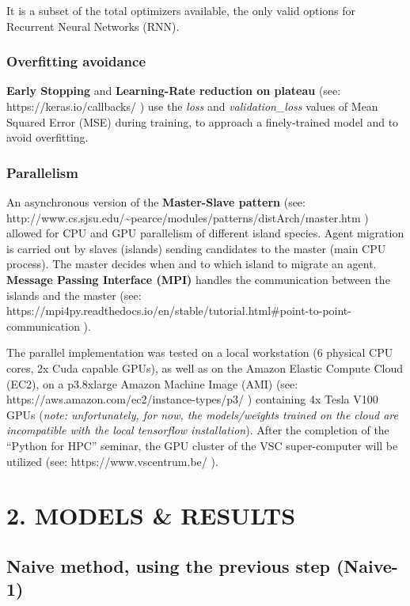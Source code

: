 \documentclass[11pt]{article}
\begin{document}
It is a subset of the total optimizers available, the only valid options
for Recurrent Neural Networks (RNN).

    \hypertarget{overfitting-avoidance}{%
\subsubsection{Overfitting avoidance}\label{overfitting-avoidance}}

\textbf{Early Stopping} and \textbf{Learning-Rate reduction on plateau}
(see: https://keras.io/callbacks/ ) use the \emph{loss} and
\emph{validation\_loss} values of Mean Squared Error (MSE) during
training, to approach a finely-trained model and to avoid overfitting.

    \hypertarget{parallelism}{%
\subsubsection{Parallelism}\label{parallelism}}

An asynchronous version of the \textbf{Master-Slave pattern} (see:
http://www.cs.sjsu.edu/\textasciitilde{}pearce/modules/patterns/distArch/master.htm
) allowed for CPU and GPU parallelism of different island species. Agent
migration is carried out by slaves (islands) sending candidates to the
master (main CPU process). The master decides when and to which island
to migrate an agent. \textbf{Message Passing Interface (MPI)} handles
the communication between the islands and the master (see:
https://mpi4py.readthedocs.io/en/stable/tutorial.html\#point-to-point-communication
).

The parallel implementation was tested on a local workstation (6
physical CPU cores, 2x Cuda capable GPUs), as well as on the Amazon
Elastic Compute Cloud (EC2), on a p3.8xlarge Amazon Machine Image (AMI)
(see: https://aws.amazon.com/ec2/instance-types/p3/ ) containing 4x
Tesla V100 GPUs (\emph{note: unfortunately, for now, the models/weights
trained on the cloud are incompatible with the local tensorflow
installation}). After the completion of the ``Python for HPC'' seminar,
the GPU cluster of the VSC super-computer will be utilized (see:
https://www.vscentrum.be/ ).

    \hypertarget{models-results}{%
\section{2. MODELS \& RESULTS}\label{models-results}}

\hypertarget{naive-method-using-the-previous-step-naive-1}{%
\subsection{Naive method, using the previous step
(Naive-1)}\label{naive-method-using-the-previous-step-naive-1}}
\end{document}
